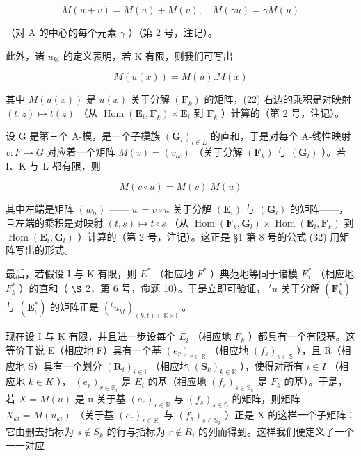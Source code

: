 \[
M (u + v) = M (u) + M (v), \quad M (\gamma u) = \gamma M (u)\tag{21}
\]

（对 A 的中心的每个元素 \(\gamma\) ）（第 2 号，注记）。

此外，诸 \(u_{ki}\) 的定义表明，若 K 有限，则我们可写出

\[
M (u (x)) = M (u). M (x)\tag{22}
\]

其中 \(M(u(x))\) 是 \(u(x)\) 关于分解 \((\mathbf{F}_k)\) 的矩阵，(22) 右边的乘积是对映射 \((t, z) \mapsto t(z)\) （从 \(\operatorname{Hom}(\mathbf{E}_i, \mathbf{F}_k) \times \mathbf{E}_i\) 到 \(\mathbf{F}_k\) ）计算的（第 2 号，注记）。

设 G 是第三个 A-模，是一个子模族 \((\mathbf{G}_{l})_{l\in L}\) 的直和，于是对每个 A-线性映射 \(v:F\to G\) 对应着一个矩阵 \(M(v)=(v_{lk})\) （关于分解 \((\mathbf{F}_{k})\) 与 \((\mathbf{G}_{l})\) ）。若 I、K 与 L 都有限，则

\[
M (v \circ u) = M (v). M (u)\tag{23}
\]

其中左端是矩阵 \((w_{li})\) —— \(w = v \circ u\) 关于分解 \((\mathbf{E}_i)\) 与 \((\mathbf{G}_l)\) 的矩阵——，且左端的乘积是对映射 \((t, s) \mapsto t \circ s\) （从 \(\operatorname{Hom}(\mathbf{F}_k, \mathbf{G}_l) \times \operatorname{Hom}(\mathbf{E}_i, \mathbf{F}_k)\) 到 \(\operatorname{Hom}(\mathbf{E}_i, \mathbf{G}_l)\) ）计算的（第 2 号，注记）。这正是 §1 第 8 号的公式 (32) 用矩阵写出的形式。

最后，若假设 I 与 K 有限，则 \(E^{*}\) （相应地 \(F^{*}\) ）典范地等同于诸模 \(E_{i}^{*}\) （相应地 \(F_{k}^{*}\) ）的直和（ \(\S\) 2，第 6 号，命题 10）。于是立即可验证， \(^{t}u\) 关于分解 \((\mathbf{F}_{k}^{*})\) 与 \((\mathbf{E}_{i}^{*})\) 的矩阵正是 \((^{t}u_{kt})_{(k,t)\in\mathbb{K}\times\mathbb{I}}\) 。

现在设 I 与 K 有限，并且进一步设每个 \(E_{i}\) （相应地 \(F_{k}\) ）都具有一个有限基。这等价于说 E（相应地 F）具有一个基 \((e_{r})_{r\in\mathbb{R}}\) （相应地 \((f_{s})_{s\in\mathbb{S}}\) ），且 R（相应地 S）具有一个划分 \((\mathbf{R}_{i})_{i\in\mathbb{I}}\) （相应地 \((\mathbf{S}_{k})_{k\in\mathbb{K}}\) ），使得对所有 \(i\in I\) （相应地 \(k\in K\) ）， \((e_{r})_{r\in\mathbb{R}_{i}}\) 是 \(E_{i}\) 的基（相应地 \((f_{s})_{s\in\mathbb{S}_{k}}\) 是 \(F_{k}\) 的基）。于是，若 \(X=M(u)\) 是 u 关于基 \((e_{r})_{r\in\mathbb{R}}\) 与 \((f_{s})_{s\in\mathbb{S}}\) 的矩阵，则矩阵 \(X_{ki}=M(u_{ki})\) （关于基 \((e_{r})_{r\in\mathbb{R}_{i}}\) 与 \((f_{s})_{s\in\mathbb{S}_{k}}\) ）正是 X 的这样一个子矩阵：它由删去指标为 \(s\notin S_{k}\) 的行与指标为 \(r\notin R_{i}\) 的列而得到。这样我们便定义了一个一一对应

